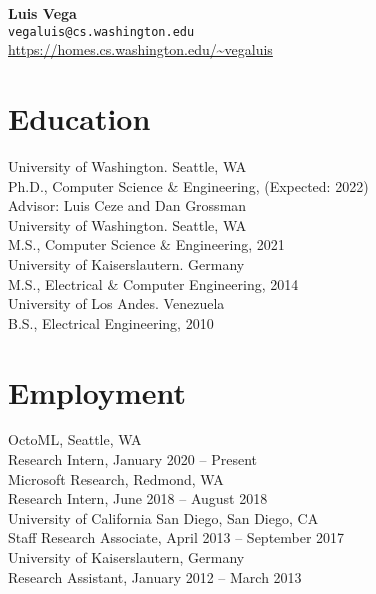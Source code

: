 \documentclass[10pt]{article}
\begin{document}
{\LARGE \textbf{Luis Vega}} \\
\texttt{vegaluis@cs.washington.edu} \\
\url{https://homes.cs.washington.edu/~vegaluis}

\section*{Education}

University of Washington. Seattle, WA \\
Ph.D., Computer Science \& Engineering, (Expected: 2022) \\
Advisor: Luis Ceze and Dan Grossman \\

University of Washington. Seattle, WA \\
M.S., Computer Science \& Engineering, 2021 \\

University of Kaiserslautern. Germany \\
M.S., Electrical \& Computer Engineering, 2014 \\

University of Los Andes. Venezuela \\
B.S., Electrical Engineering, 2010 \\

\section*{Employment}

OctoML, Seattle, WA \\
Research Intern, January 2020 -- Present \\

Microsoft Research, Redmond, WA \\
Research Intern, June 2018 -- August 2018 \\

University of California San Diego, San Diego, CA \\
Staff Research Associate, April 2013 -- September 2017 \\

University of Kaiserslautern, Germany \\
Research Assistant, January 2012 -- March 2013 \\

\end{document}
